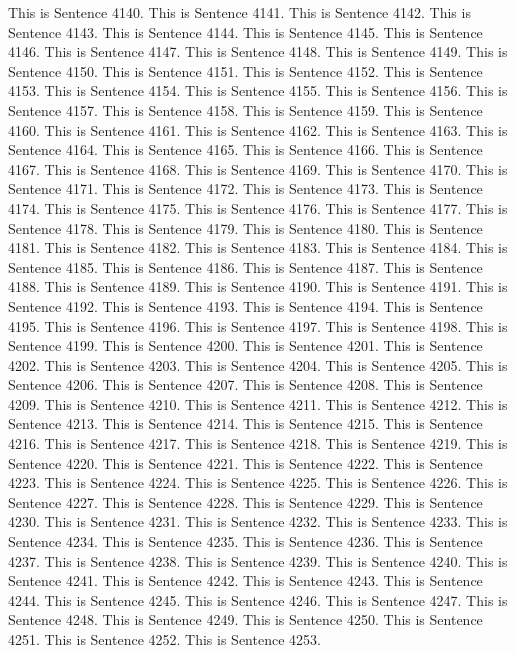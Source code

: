 \documentclass{article}
\begin{document}
This is Sentence 4140.
This is Sentence 4141.
This is Sentence 4142.
This is Sentence 4143.
This is Sentence 4144.
This is Sentence 4145.
This is Sentence 4146.
This is Sentence 4147.
This is Sentence 4148.
This is Sentence 4149.
This is Sentence 4150.
This is Sentence 4151.
This is Sentence 4152.
This is Sentence 4153.
This is Sentence 4154.
This is Sentence 4155.
This is Sentence 4156.
This is Sentence 4157.
This is Sentence 4158.
This is Sentence 4159.
This is Sentence 4160.
This is Sentence 4161.
This is Sentence 4162.
This is Sentence 4163.
This is Sentence 4164.
This is Sentence 4165.
This is Sentence 4166.
This is Sentence 4167.
This is Sentence 4168.
This is Sentence 4169.
This is Sentence 4170.
This is Sentence 4171.
This is Sentence 4172.
This is Sentence 4173.
This is Sentence 4174.
This is Sentence 4175.
This is Sentence 4176.
This is Sentence 4177.
This is Sentence 4178.
This is Sentence 4179.
This is Sentence 4180.
This is Sentence 4181.
This is Sentence 4182.
This is Sentence 4183.
This is Sentence 4184.
This is Sentence 4185.
This is Sentence 4186.
This is Sentence 4187.
This is Sentence 4188.
This is Sentence 4189.
This is Sentence 4190.
This is Sentence 4191.
This is Sentence 4192.
This is Sentence 4193.
This is Sentence 4194.
This is Sentence 4195.
This is Sentence 4196.
This is Sentence 4197.
This is Sentence 4198.
This is Sentence 4199.
This is Sentence 4200.
This is Sentence 4201.
This is Sentence 4202.
This is Sentence 4203.
This is Sentence 4204.
This is Sentence 4205.
This is Sentence 4206.
This is Sentence 4207.
This is Sentence 4208.
This is Sentence 4209.
This is Sentence 4210.
This is Sentence 4211.
This is Sentence 4212.
This is Sentence 4213.
This is Sentence 4214.
This is Sentence 4215.
This is Sentence 4216.
This is Sentence 4217.
This is Sentence 4218.
This is Sentence 4219.
This is Sentence 4220.
This is Sentence 4221.
This is Sentence 4222.
This is Sentence 4223.
This is Sentence 4224.
This is Sentence 4225.
This is Sentence 4226.
This is Sentence 4227.
This is Sentence 4228.
This is Sentence 4229.
This is Sentence 4230.
This is Sentence 4231.
This is Sentence 4232.
This is Sentence 4233.
This is Sentence 4234.
This is Sentence 4235.
This is Sentence 4236.
This is Sentence 4237.
This is Sentence 4238.
This is Sentence 4239.
This is Sentence 4240.
This is Sentence 4241.
This is Sentence 4242.
This is Sentence 4243.
This is Sentence 4244.
This is Sentence 4245.
This is Sentence 4246.
This is Sentence 4247.
This is Sentence 4248.
This is Sentence 4249.
This is Sentence 4250.
This is Sentence 4251.
This is Sentence 4252.
This is Sentence 4253.
\end{document}
